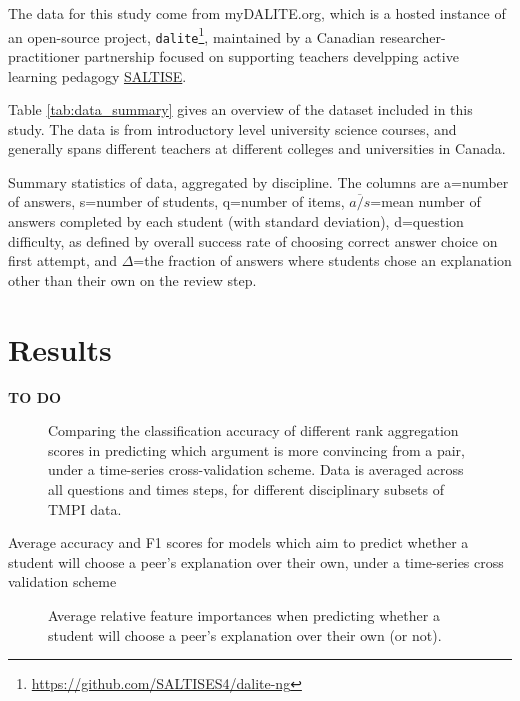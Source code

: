 \documentclass[sigconf]{acmart}
\begin{document}
The data for this study come from myDALITE.org, which is a hosted instance of 
an open-source project, 
\verb|dalite|\footnote{\url{https://github.com/SALTISES4/dalite-ng}}, 
maintained by a Canadian researcher-practitioner partnership focused on 
supporting teachers develpping active learning pedagogy 
\href{saltise.ca}{SALTISE}.

Table \ref{tab:data_summary} gives an overview of the dataset included in this 
study.
The data is from introductory level university science courses, and generally 
spans different teachers at different colleges and universities in Canada. 
 
\begin{table}
	
	\caption{
		Summary statistics of data, aggregated by discipline. 
		The columns are a=number of answers, s=number of students, q=number of 
		items, $\overline{a/s}$=mean number of answers completed by each 
		student (with standard deviation), d=question difficulty, as defined by 
		overall success rate of choosing correct answer choice on first 
		attempt, and $\Delta$=the fraction of answers where students chose an 
		explanation other than their own on the review step. 
	}
	\label{tab:data_summary}
\end{table}

\section{Results}
\textbf{TO DO}



\begin{figure}
	\scalebox{0.6}{}
	\caption{
		Comparing the classification accuracy of different rank aggregation 
		scores in predicting which argument is more convincing from a pair, 
		under a time-series cross-validation scheme. Data is averaged across 
		all questions and times steps, for different disciplinary subsets of 
		TMPI data. 
	}
	\label{fig:acc_by_rank_score_type}
\end{figure}


\begin{table}
	
	\caption{
		Average accuracy and F1 scores for models which aim to predict whether 
		a student will choose a peer's explanation over their own, under a 
		time-series cross validation scheme
	}
	\label{tab:switch_exp_acc}
\end{table}


\begin{figure}
	\scalebox{0.6}{}
	\caption{
		Average relative feature importances when predicting whether a student 
		will choose a peer's explanation over their own (or not).
	}
	\label{fig:switch_exp_feature_imp}
\end{figure}
\end{document}
